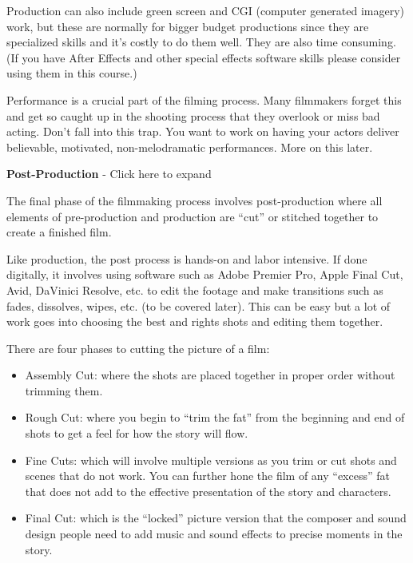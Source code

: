 \documentclass[
]{book}
\providecommand{\tightlist}{%
  \setlength{\itemsep}{0pt}\setlength{\parskip}{0pt}}
\begin{document}
Production can also include green screen and CGI (computer generated imagery) work, but these are normally for bigger budget productions since they are specialized skills and it's costly to do them well. They are also time consuming. (If you have After Effects and other special effects software skills please consider using them in this course.)

Performance is a crucial part of the filming process. Many filmmakers forget this and get so caught up in the shooting process that they overlook or miss bad acting. Don't fall into this trap. You want to work on having your actors deliver believable, motivated, non-melodramatic performances. More on this later.

\textbf{Post-Production} - Click here to expand

The final phase of the filmmaking process involves post-production where all elements of pre-production and production are ``cut'' or stitched together to create a finished film.

Like production, the post process is hands-on and labor intensive. If done digitally, it involves using software such as Adobe Premier Pro, Apple Final Cut, Avid, DaVinici Resolve, etc. to edit the footage and make transitions such as fades, dissolves, wipes, etc. (to be covered later). This can be easy but a lot of work goes into choosing the best and rights shots and editing them together.

There are four phases to cutting the picture of a film:

\begin{itemize}
\tightlist
\item
  Assembly Cut: where the shots are placed together in proper order without trimming them.\\
\item
  Rough Cut: where you begin to ``trim the fat'' from the beginning and end of shots to get a feel for how the story will flow.\\
\item
  Fine Cuts: which will involve multiple versions as you trim or cut shots and scenes that do not work. You can further hone the film of any ``excess'' fat that does not add to the effective presentation of the story and characters.\\
\item
  Final Cut: which is the ``locked'' picture version that the composer and sound design people need to add music and sound effects to precise moments in the story.
\end{itemize}
\end{document}
